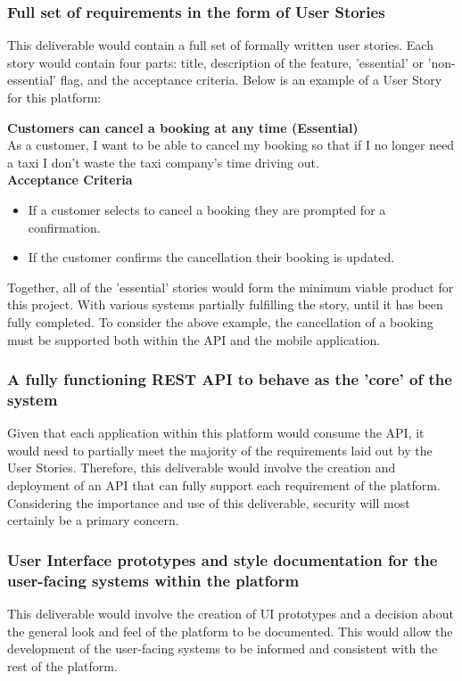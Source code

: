 \subsubsection{Full set of requirements in the form of User Stories}
This deliverable would contain a full set of formally written user stories.
Each story would contain four parts: title, description of the feature, 'essential' or 'non-essential' flag, and the acceptance criteria. Below is an example of a User Story for this platform:

\textbf{Customers can cancel a booking at any time (Essential)}\\
As a customer, I want to be able to cancel my booking so that if I no longer need a taxi I don't waste the taxi company's time driving out.\\

\textbf{Acceptance Criteria}
\begin{itemize}
	\item If a customer selects to cancel a booking they are prompted for a confirmation.
	\item If the customer confirms the cancellation their booking is updated.
\end{itemize}

Together, all of the 'essential' stories would form the minimum viable product for this project. With various systems partially fulfilling the story, until it has been fully completed. To consider the above example, the cancellation of a booking must be supported both within the API and the mobile application.

\subsubsection{A fully functioning REST API to behave as the 'core' of the system}
Given that each application within this platform would consume the API, it would need to partially meet the majority of the requirements laid out by the User Stories. Therefore, this deliverable would involve the creation and deployment of an API that can fully support each requirement of the platform. Considering the importance and use of this deliverable, security will most certainly be a primary concern.

\subsubsection{User Interface prototypes and style documentation for the user-facing systems within the platform}
This deliverable would involve the creation of UI prototypes and a decision about the general look and feel of the platform to be documented. This would allow the development of the user-facing systems to be informed and consistent with the rest of the platform.

